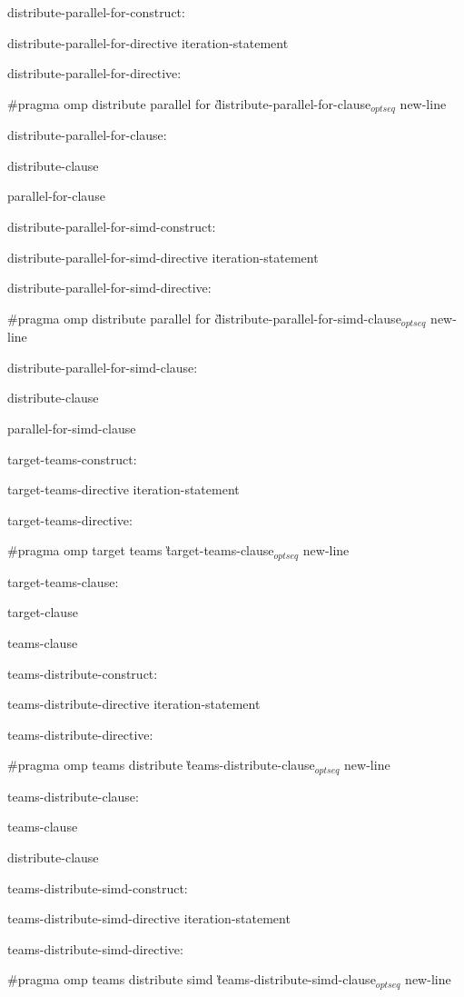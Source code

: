{distribute-parallel-for-construct:

\I distribute-parallel-for-directive iteration-statement

distribute-parallel-for-directive:

\C\I \#pragma omp distribute parallel for \G distribute-parallel-for-clause$_{optseq}$ new-line

\I distribute-parallel-for-clause:

\I\I distribute-clause

\I\I parallel-for-clause

\I distribute-parallel-for-simd-construct:

\I\I distribute-parallel-for-simd-directive iteration-statement

\I distribute-parallel-for-simd-directive:

\C\I\I \#pragma omp distribute parallel for \G distribute-parallel-for-simd-clause$_{optseq}$ new-line

\I distribute-parallel-for-simd-clause:

\I\I distribute-clause

\I\I parallel-for-simd-clause

\I target-teams-construct:

\I\I target-teams-directive iteration-statement

\I target-teams-directive:

\C\I\I \#pragma omp target teams \G target-teams-clause$_{optseq}$ new-line

\I target-teams-clause:

\I\I target-clause

\I\I teams-clause

\I teams-distribute-construct:

\I\I teams-distribute-directive iteration-statement

\I teams-distribute-directive:

\C\I\I \#pragma omp teams distribute \G teams-distribute-clause$_{optseq}$ new-line

\I teams-distribute-clause:

\I\I teams-clause

\I\I distribute-clause

\I teams-distribute-simd-construct:

\I\I teams-distribute-simd-directive iteration-statement

\I teams-distribute-simd-directive:

\C\I \#pragma omp teams distribute simd \G teams-distribute-simd-clause$_{optseq}$ new-line

}
